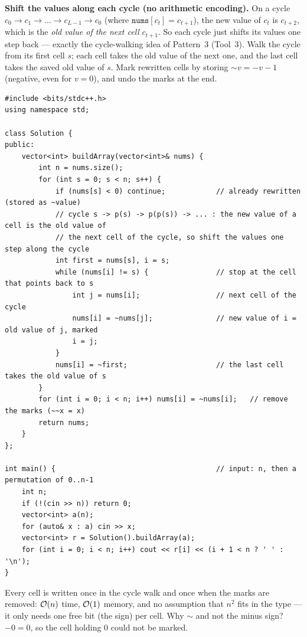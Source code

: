 \begin{alternativebox}
\textbf{Shift the values along each cycle (no arithmetic encoding).} On a cycle $c_0 \to c_1 \to \dots \to c_{L-1} \to c_0$ (where $\texttt{nums}[c_t] = c_{t+1}$), the new value of $c_t$ is $c_{t+2}$, which is the \emph{old value of the next cell} $c_{t+1}$. So each cycle just shifts its values one step back --- exactly the cycle-walking idea of Pattern~3 (Tool~3). Walk the cycle from its first cell $s$; each cell takes the old value of the next one, and the last cell takes the saved old value of $s$. Mark rewritten cells by storing $\sim\!v = -v - 1$ (negative, even for $v = 0$), and undo the marks at the end.
\begin{lstlisting}[style=cpp]
#include <bits/stdc++.h>
using namespace std;

class Solution {
public:
    vector<int> buildArray(vector<int>& nums) {
        int n = nums.size();
        for (int s = 0; s < n; s++) {
            if (nums[s] < 0) continue;            // already rewritten (stored as ~value)
            // cycle s -> p(s) -> p(p(s)) -> ... : the new value of a cell is the old value of
            // the next cell of the cycle, so shift the values one step along the cycle
            int first = nums[s], i = s;
            while (nums[i] != s) {                // stop at the cell that points back to s
                int j = nums[i];                  // next cell of the cycle
                nums[i] = ~nums[j];               // new value of i = old value of j, marked
                i = j;
            }
            nums[i] = ~first;                     // the last cell takes the old value of s
        }
        for (int i = 0; i < n; i++) nums[i] = ~nums[i];   // remove the marks (~~x = x)
        return nums;
    }
};

int main() {                                      // input: n, then a permutation of 0..n-1
    int n;
    if (!(cin >> n)) return 0;
    vector<int> a(n);
    for (auto& x : a) cin >> x;
    vector<int> r = Solution().buildArray(a);
    for (int i = 0; i < n; i++) cout << r[i] << (i + 1 < n ? ' ' : '\n');
}
\end{lstlisting}
Every cell is written once in the cycle walk and once when the marks are removed: $\mathcal{O}(n)$ time, $\mathcal{O}(1)$ memory, and no assumption that $n^2$ fits in the type --- it only needs one free bit (the sign) per cell. Why $\sim$ and not the minus sign? $-0 = 0$, so the cell holding 0 could not be marked.


\end{alternativebox}
